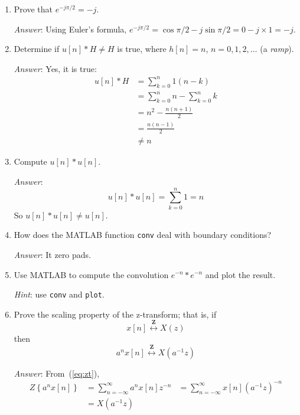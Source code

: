 \begin{enumerate}
\item Prove that $e^{-j\pi/2}=-j$.\label{it:ch6ex7}

  \textit{Answer}: Using Euler's formula,
  $e^{-j\pi/2}=\cos\pi/2-j\sin\pi/2=0-j \times 1=-j$.

\item Determine if $u[n] \ast H \ne H$ is true, where $h[n] = n$,
  $n=0,1,2,\ldots$ (a \emph{ramp}).\label{it:ch6ex8}

  \textit{Answer}: Yes, it is true:
  \begin{align*}
    u[n] \ast H &= \sum_{k=0}^{n}1 (n-k) \\
    &= \sum_{k=0}^{n}n -\sum_{k=0}^{n} k \\
    &= n^2 - \frac{n(n+1)}{2} \\
    &= \frac{n(n-1)}{2} \\
    &\ne n
  \end{align*}

\item Compute $u[n] \ast u[n]$.\label{it:ch6ex9}

  \textit{Answer}:
  \begin{equation}
    u[n] \ast u[n]=\sum_{k=0}^{n}1=n
  \end{equation}
  So $u[n] \ast u[n] \ne u[n]$.

\item How does the MATLAB function \verb|conv| deal with boundary
  conditions?\label{it:ch6ex10}

  \textit{Answer}: It zero pads.

\item Use MATLAB to compute the convolution $e^{-n} \ast e^{-n}$ and
  plot the result.\label{it:ch6ex11}

  \textit{Hint}: use \texttt{conv} and \texttt{plot}.

\item Prove the scaling property of the z-transform; that is, if
  \begin{equation*}
    x[n]\stackrel{\mathbf{Z}}{\longleftrightarrow} X(z)
  \end{equation*}
  then 
  \begin{equation*}
    a^nx[n]\stackrel{\mathbf{Z}}{\longleftrightarrow} X(a^{-1}z)
  \end{equation*}\label{it:ch6ex12}

  \textit{Answer}:
  From~(\ref{eq:zt}), 
  \begin{align*}
    Z\left\{a^nx[n]\right\} &= \sum_{n=-\infty}^{\infty} a^nx[n]z^{-n}
    &= \sum_{n=-\infty}^{\infty}x[n](a^{-1}z)^{-n} \\
    &= X(a^{-1}z)
  \end{align*}

\end{enumerate}


